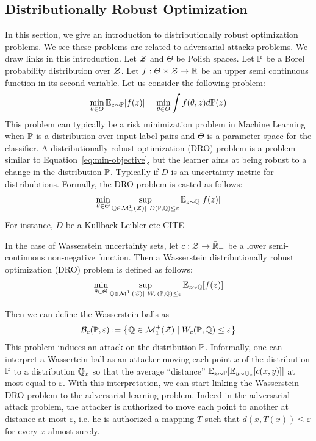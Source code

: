 \subsection{Distributionally Robust Optimization}

In this section, we give an introduction to distributionally robust optimization problems. We see these problems are related to adversarial attacks problems. We draw links in this introduction.  Let $\mathcal{Z}$ and $\Theta$ be Polish spaces. Let $\mathbb{P}$ be a Borel probability distribution over $\mathcal{Z}$. Let $f:\Theta\times\mathcal{Z}\to\mathbb{R}$ be an upper semi continuous function in its second variable. Let us consider the following problem:
\begin{align}
    \label{eq:min-objective}
    \min_{\theta\in\Theta} \mathbb{E}_{z\sim\PP}\left[f(z)\right] = \min_{\theta\in\Theta} \int f(\theta,z)d\PP(z)
\end{align}
This problem can typically be a risk minimization problem in Machine Learning when $\mathbb{P}$ is a distribution over input-label pairs and $\Theta$ is a parameter space for the classifier. A distributionally robust optimization (DRO) problem is a problem similar to Equation~\eqref{eq:min-objective}, but the learner aims at being robust to a change in the distribution $\mathbb{P}$. Typically if $D$ is an uncertainty metric for distribubtions. Formally, the DRO problem is casted as follows:
\begin{align*}
    \min_{\theta\in\Theta}\sup_{\QQ\in\mathcal{M}^1_+(\ZZ)\mid~D(\PP,\QQ)\leq \varepsilon}\mathbb{E}_{z\sim\QQ}\left[f(z)\right]
\end{align*}
For instance, $D$ be a Kullback-Leibler etc CITE

In the case of Wasserstein uncertainty sets, let $c:\mathcal{Z}\to\bar{\mathbb{R}}_+$ be a lower semi-continuous non-negative function. Then a  Wasserstein distributionally robust optimization (DRO) problem is defined as follows:
\begin{align*}
    \min_{\theta\in\Theta}\sup_{\QQ\in\mathcal{M}^1_+(\ZZ)\mid~W_c(\PP,\QQ)\leq \varepsilon}\mathbb{E}_{z\sim\QQ}\left[f(z)\right]
\end{align*}

Then we can define the Wasserstein balls as 
\begin{align*}
    \mathcal{B}_{c}(\PP,\varepsilon) := \left\{\QQ\in \mathcal{M}^+_1(\mathcal{Z})\mid W_c(\PP,\QQ)\leq \varepsilon\right\}
\end{align*}
This problem induces an attack on the distribution $\mathbb{P}$. Informally, one can interpret a Wassertein ball as an attacker moving each point $x$ of the distribution $\mathbb{P}$ to a distribution $\mathbb{Q}_x$ so that the average ``distance'' $\mathbb{E}_{x\sim\PP}\left[\mathbb{E}_{y\sim\QQ_x}\left[c(x,y)\right]\right]$ at most equal to $\varepsilon$. With this interpretation, we can start linking the Wasserstein DRO problem to the adversarial learning problem. Indeed in the adversarial attack problem, the attacker is authorized to move each point to another at distance at most $\varepsilon$, i.e. he is authorized a mapping $T$ such that $d(x,T(x))\leq \varepsilon$ for every $x$ almost surely. 
